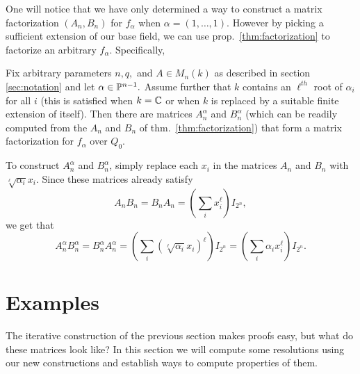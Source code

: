 \documentclass [11pt, proquest] {uwthesis}[2020/02/24]
\begin{document}
    One will notice that we have only determined a way to construct a matrix factorization $(A_n,B_n)$ for $f_\alpha$ when $\alpha=(1,\dots,1).$ However by picking a sufficient extension of our base field, we can use prop.~\ref{thm:factorization} to factorize an arbitrary $f_\alpha$. Specifically,
    \begin{thm}\label{thm:factorization_general}
        Fix arbitrary parameters $n,q,$ and $A\in M_n(k)$ as described in section \ref{sec:notation} and let $\alpha\in\mathbb{P}^{n-1}.$ Assume further that $k$ contains an $\ell^{th}$ root of $\alpha_i$ for all $i$ (this is satisfied when $k=\mathbb{C}$ or when $k$ is replaced by a suitable finite extension of itself). Then there are matrices $A_n^\alpha$ and $B_n^\alpha$ (which can be readily computed from the $A_n$ and $B_n$ of thm.~\ref{thm:factorization}) that form a matrix factorization for $f_\alpha$ over $Q_0$.
    \end{thm}
    \begin{prf}
        To construct $A_n^\alpha$ and $B_n^\alpha$, simply replace each $x_i$ in the matrices $A_n$ and $B_n$ with $\sqrt[\ell]{\alpha_i}x_i$. Since these matrices already satisfy
        \[A_nB_n=B_nA_n=\left(\sum_i x_i^\ell\right)I_{2^n},\]
        we get that
        \[A_n^\alpha B_n^\alpha=B_n^\alpha A_n^\alpha=\left(\sum_i (\sqrt[\ell]{\alpha_i}x_i)^\ell\right)I_{2^n}=\left(\sum_i\alpha_ix_i^\ell\right)I_{2^n}.\]
    \end{prf}

\section{Examples}
    The iterative construction of the previous section makes proofs easy, but what do these matrices look like? In this section we will compute some resolutions using our new constructions and establish ways to compute properties of them.
\end{document}
